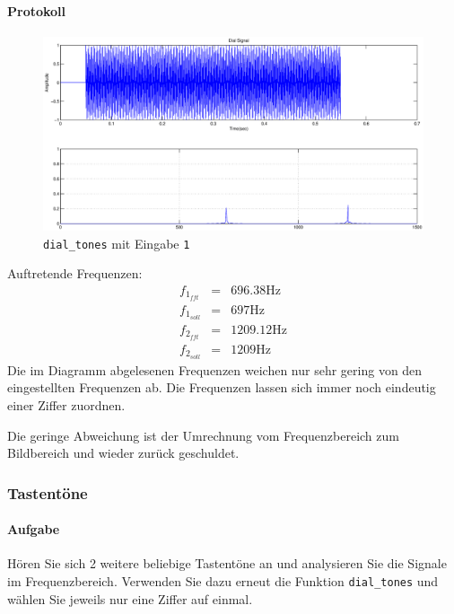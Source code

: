 \documentclass[10pt]{report}
\begin{document}
        \paragraph{Protokoll}
        \begin{center}
            \begin{figure}[H]
                \includegraphics[width=\textwidth]{img4341}
              \caption{\texttt{dial\_tones} mit Eingabe \texttt{1}}
            \end{figure}
        \end{center}
        Auftretende Frequenzen:
        \begin{eqnarray*}
            f_{1_{fft}} &=& 696.38 \si{\hertz}\\
            f_{1_{soll}} &=& 697\si{\hertz}\\
            f_{2_{fft}} &=& 1209.12\si{\hertz}\\
            f_{2_{soll}} &=& 1209\si{\hertz}
        \end{eqnarray*}
        Die im Diagramm abgelesenen Frequenzen weichen nur sehr gering von den
        eingestellten Frequenzen ab. Die Frequenzen lassen sich immer noch eindeutig
        einer Ziffer zuordnen.

        Die geringe Abweichung ist der Umrechnung
        vom Frequenzbereich zum Bildbereich und wieder zurück geschuldet.

        \subsubsection{Tastentöne}
        \paragraph{Aufgabe}
        Hören Sie sich 2 weitere beliebige Tastentöne an und analysieren Sie die Signale im
        Frequenzbereich. Verwenden Sie dazu erneut die Funktion \texttt{dial\_tones} und wählen
        Sie jeweils nur eine Ziffer auf einmal.
\end{document}
